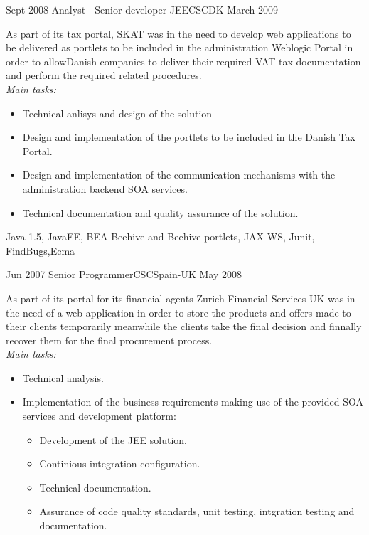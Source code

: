 \begin{experiences}
  \emptySeparator

  \experience
    {Sept 2008}     {Analyst | Senior developer JEE}{CSC}{DK}
    {March 2009}    {

As part of its tax portal, SKAT was in the need to develop web applications to be delivered as
portlets to be included in the administration Weblogic Portal in order to allowDanish
companies to deliver their required VAT tax documentation and perform the required related
procedures.    
\\
\emph{Main tasks:}        
                      \begin{itemize}
                        \item Technical anlisys and design of the solution	
                        \item Design and implementation of the portlets to be included in the Danish Tax Portal.	                
                        \item Design and implementation of the communication mechanisms with the administration backend SOA services.
                        \item Technical documentation and quality assurance of the solution.
                      \end{itemize}
                    }
                    {Java 1.5, JavaEE, BEA Beehive and Beehive portlets, JAX-WS, Junit, FindBugs,Ecma}
  
  
  
  \emptySeparator
  
  
  
  \experience
  {Jun 2007}       {Senior Programmer}{CSC}{Spain-UK}
  {May 2008}   {
  
  As part of its portal for its financial agents Zurich Financial Services UK was in the need of a web application in order to store the products and offers made to their clients temporarily meanwhile the clients take the final decision and finnally recover them for the final procurement process.
\\
\emph{Main tasks:}  
                      \begin{itemize}
                        
                        \item Technical analysis. 

                        \item Implementation of the business requirements making use of the provided SOA services and development platform:
                        \begin{itemize}
                          \item Development of the JEE solution.
                          \item Continious integration configuration.
                          \item Technical documentation.
                          \item Assurance of code quality standards, unit testing, intgration testing and documentation. 
                        \end{itemize}


\end{itemize}}
\end{experiences}
